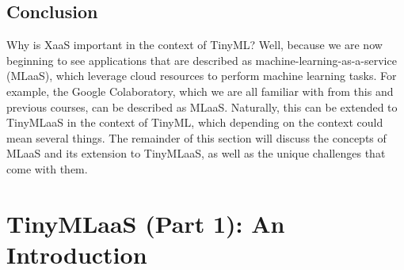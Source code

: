 {{{{{\subsection{Conclusion}

Why is XaaS important in the context of TinyML? Well, because we are now beginning to see applications that are described as machine-learning-as-a-service (MLaaS), which leverage cloud resources to perform machine learning tasks. For example, the Google Colaboratory, which we are all familiar with from this and previous courses, can be described as MLaaS. Naturally, this can be extended to TinyMLaaS in the context of TinyML, which depending on the context could mean several things. The remainder of this section will discuss the concepts of MLaaS and its extension to TinyMLaaS, as well as the unique challenges that come with them. 

\section{TinyMLaaS (Part 1): An Introduction}


}}}}}
